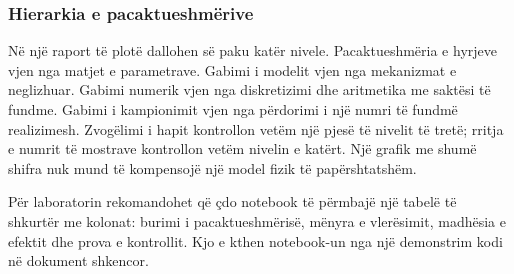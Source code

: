 \subsubsection{Hierarkia e pacaktueshmërive}
Në një raport të plotë dallohen së paku katër nivele. Pacaktueshmëria e hyrjeve vjen nga matjet e parametrave. Gabimi i modelit vjen nga mekanizmat e neglizhuar. Gabimi numerik vjen nga diskretizimi dhe aritmetika me saktësi të fundme. Gabimi i kampionimit vjen nga përdorimi i një numri të fundmë realizimesh. Zvogëlimi i hapit kontrollon vetëm një pjesë të nivelit të tretë; rritja e numrit të mostrave kontrollon vetëm nivelin e katërt. Një grafik me shumë shifra nuk mund të kompensojë një model fizik të papërshtatshëm.

Për laboratorin rekomandohet që çdo notebook të përmbajë një tabelë të shkurtër me kolonat: burimi i pacaktueshmërisë, mënyra e vlerësimit, madhësia e efektit dhe prova e kontrollit. Kjo e kthen notebook-un nga një demonstrim kodi në dokument shkencor.
